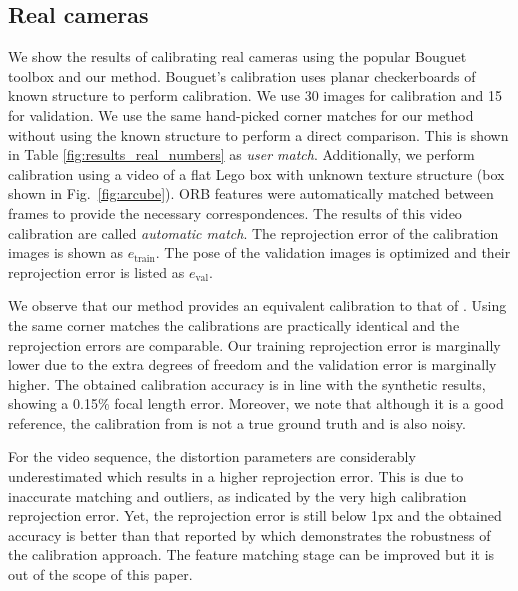 \documentclass[10pt,twocolumn,letterpaper]{article}
\begin{document}
\subsection{Real cameras}
We show the results of calibrating real cameras using the popular Bouguet toolbox \cite{bouguetMCT} and our method. Bouguet's calibration uses planar checkerboards of known structure to perform calibration. We use 30 images for calibration and 15 for validation. We use the same hand-picked corner matches for our method without using the known structure to perform a direct comparison. This is shown in Table \ref{fig:results_real_numbers} as \emph{user match}. Additionally, we perform calibration using a video of a flat Lego box with unknown texture structure (box shown in Fig.~\ref{fig:arcube}). ORB features were automatically matched between frames to provide the necessary correspondences. The results of this video calibration are called \emph{automatic match}. The reprojection error of the calibration images is shown as $e_\text{train}$. The pose of the validation images is optimized and their reprojection error is listed as $e_\text{val}$. 

We observe that our method provides an equivalent calibration to that of \cite{bouguetMCT}. Using the same corner matches the calibrations are practically identical and the reprojection errors are comparable. Our training reprojection error is marginally lower due to the extra degrees of freedom and the validation error is marginally higher. The obtained calibration accuracy is in line with the synthetic results, showing a 0.15\% focal length error. Moreover, we note that although it is a good reference, the calibration from \cite{bouguetMCT} is not a true ground truth and is also noisy.

For the video sequence, the distortion parameters are considerably underestimated which results in a higher reprojection error. This is due to inaccurate matching and outliers, as indicated by the very high calibration reprojection error. Yet, the reprojection error is still below 1px and the obtained accuracy is better than that reported by \cite{gurdjos2003} which demonstrates the robustness of the calibration approach. The feature matching stage can be improved but it is out of the scope of this paper.
\end{document}
